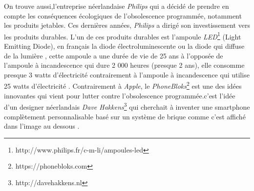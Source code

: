 \smallbreak
On trouve aussi,l'entreprise néerlandaise \textit{Philips} qui a décidé de prendre en compte les conséquences écologiques de l'obsolescence programmée, notamment les produits jetables. Ces dernières années, \textit{Philips} a dirigé son investissement vers  les produits durables. L'un de ces produits durables est l’ampoule \textit{LED}\footnote{http://www.philips.fr/c-m-li/ampoules-led} (Light Emitting Diode), en français la diode électroluminescente ou la diode qui  diffuse de la lumière , cette ampoule a une durée de vie de 25 ans à l'opposée de l'ampoule à incandescence qui dure 2 000 heures (presque 2 ans), elle consomme presque 3 watts d’électricité contrairement à l'ampoule à incandescence qui utilise 25 watts d’électricité \cite{ampoule_inc}. 
\newpage
\smallbreak
Contrairement à \textit{Apple}, le \textit{PhoneBloks}\footnote{https://phonebloks.com} est une des idées innovantes qui vient pour lutter contre l'obsolescence programmée.c'est l'idée d'un designer néerlandais \textit{Dave Hakkens}\footnote{http://davehakkens.nl} qui cherchait à inventer une smartphone complètement personnalisable basé sur un système de brique comme c'est affiché dans l'image au dessous \cite{op_pb}.
